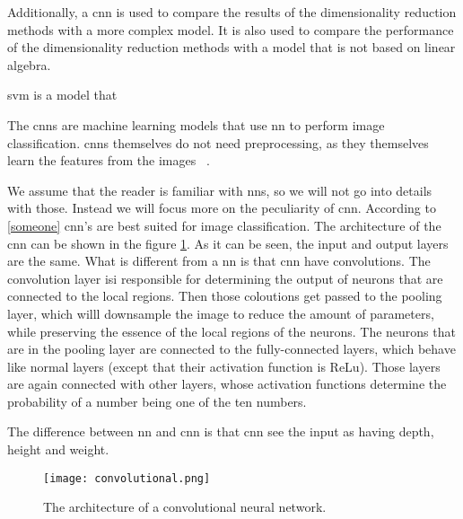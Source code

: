 
Additionally, a \gls{cnn} is used to compare the results of the dimensionality reduction methods with a more complex model. It is also used to compare the performance of the dimensionality reduction methods with a model that is not based on linear algebra.

\label{subsubsec:support-vector-machine}
\gls{svm} is a model that 

\label{subsubsec:convolutional-neural-networks}
The \gls{cnn}s are machine learning models that use \gls{nn} to perform image classification. \gls{cnn}s themselves do not need preprocessing, as they themselves learn the features from the images ~\cite{convolutional-neural-networks-google}.

We assume that the reader is familiar with \gls{nn}s, so we will not go into details with those. Instead we will focus more on the peculiarity of \gls{cnn}. According to \ref{someone} \gls{cnn}'s are best suited for image classification. The architecture of the \gls{cnn} can be shown in the figure \ref{fig:convolutional}. As it can be seen, the input and output layers are the same. What is different from a \gls{nn} is that \gls{cnn} have convolutions. The convolution layer isi responsible for determining the output of neurons that are connected to the local regions. Then those coloutions get passed  to the pooling layer, which willl downsample the image to reduce the amount of parameters, while preserving the essence of the local regions of the neurons. The neurons that are in the pooling layer are connected to the fully-connected layers, which behave like normal layers (except that their activation function is ReLu). Those layers are again connected with other layers, whose activation functions determine the probability of a number being one of the ten numbers.


The difference between \gls{nn} and \gls{cnn} is that \gls{cnn} see the input as having depth, height and weight.

\begin{figure}[h]
\centering
\texttt{[image: convolutional.png]}
\caption{The architecture of a convolutional neural network.}
\label{fig:convolutional}
\end{figure}

